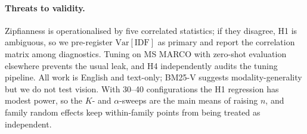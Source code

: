 \documentclass[11pt]{article}
\newcommand{\idf}{\mathrm{IDF}}
\begin{document}
\paragraph{Threats to validity.} Zipfianness is operationalised by five correlated statistics; if they disagree, H1 is ambiguous, so we pre-register $\mathrm{Var}[\idf]$ as primary and report the correlation matrix among diagnostics. Tuning on MS MARCO with zero-shot evaluation elsewhere prevents the usual leak, and H4 independently audits the tuning pipeline. All work is English and text-only; BM25-V \citep{han2026bm25v} suggests modality-generality but we do not test vision. With 30--40 configurations the H1 regression has modest power, so the $K$- and $\alpha$-sweeps are the main means of raising $n$, and family random effects keep within-family points from being treated as independent.



\end{document}
